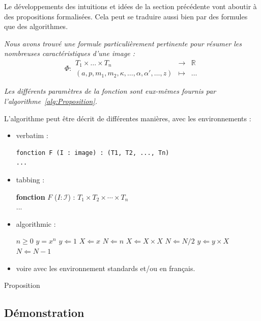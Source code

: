 \documentclass[11pt, french]{report-rd-info}
\begin{document}
Le développements des intuitions et idées de la section précédente vont aboutir à des propositions formalisées. Cela peut se traduire aussi bien par des formules que des algorithmes.

\emph{Nous avons trouvé une formule particulièrement pertinente pour résumer les nombreuses caractéristiques d'une image :}
\begin{equation}
	\label{eq:Proposition}
	\Phi :
		\begin{array}{ccc}
			T_1 \times \ldots \times T_n & \to & \mathbb{R}\\
			(a, p, m_1, m_2, \kappa, \ldots, \alpha, \alpha', \ldots,z) & \mapsto & \ldots
		\end{array}
\end{equation}

\emph{Les différents paramètres de la fonction sont eux-mêmes fournis par l'algorithme~\ref{alg:Proposition}.}

\begin{algorithm*}
	L'algorithme peut être décrit de différentes manières, avec les environnements :
	\begin{itemize}
		\item verbatim :
			\begin{verbatim}
fonction F (I : image) : (T1, T2, ..., Tn)
...
			\end{verbatim}
		\item tabbing :
			\begin{tabbing}
				\textbf{fonction} $F$ ($I : \mathcal{I}$) : $T_1 \times T_2 \times \cdots \times T_n$\\
				...
			\end{tabbing}
		\item algorithmic :
			\begin{algorithmic}[1]
				\REQUIRE $n \geq 0$
				\ENSURE $y = x^n$
				\STATE $y \Leftarrow 1$
				\STATE $X \Leftarrow x$
				\STATE $N \Leftarrow n$
						\STATE $X \Leftarrow X \times X$
						\STATE $N \Leftarrow N / 2$
					\ELSE[$N$ is odd]
						\STATE $y \Leftarrow y \times X$
						\STATE $N \Leftarrow N - 1$
					\ENDIF
				\ENDWHILE
			\end{algorithmic}
		\item voire avec les environnement standards et/ou en français.
	\end{itemize}
	\caption{Proposition}
	\label{alg:Proposition}
\end{algorithm*}

\subsection{Démonstration}
\end{document}

